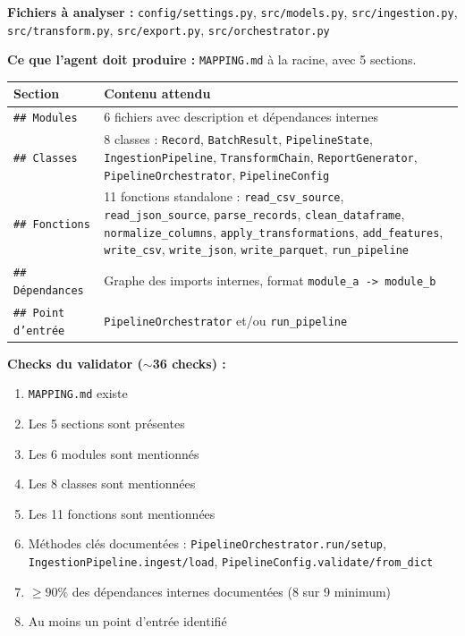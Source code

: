 \documentclass[11pt,a4paper]{article}
\newcommand{\code}[1]{\texttt{#1}}
\begin{document}
\textbf{Fichiers à analyser :}
\code{config/settings.py}, \code{src/models.py}, \code{src/ingestion.py},
\code{src/transform.py}, \code{src/export.py}, \code{src/orchestrator.py}

\textbf{Ce que l'agent doit produire :} \code{MAPPING.md} à la racine, avec 5 sections.

\begin{center}
\begin{tabular}{lp{9cm}}
  \toprule
  Section & Contenu attendu \\
  \midrule
  \code{\#\# Modules}      & 6 fichiers avec description et dépendances internes \\
  \code{\#\# Classes}      & 8 classes : \code{Record}, \code{BatchResult}, \code{PipelineState},
                             \code{IngestionPipeline}, \code{TransformChain},
                             \code{ReportGenerator}, \code{PipelineOrchestrator},
                             \code{PipelineConfig} \\
  \code{\#\# Fonctions}    & 11 fonctions standalone : \code{read\_csv\_source},
                             \code{read\_json\_source}, \code{parse\_records},
                             \code{clean\_dataframe}, \code{normalize\_columns},
                             \code{apply\_transformations}, \code{add\_features},
                             \code{write\_csv}, \code{write\_json}, \code{write\_parquet},
                             \code{run\_pipeline} \\
  \code{\#\# Dépendances}  & Graphe des imports internes, format \texttt{module\_a -> module\_b} \\
  \code{\#\# Point d'entrée} & \code{PipelineOrchestrator} et/ou \code{run\_pipeline} \\
  \bottomrule
\end{tabular}
\end{center}

\textbf{Checks du validator ($\sim$36 checks) :}
\begin{enumerate}
  \item \code{MAPPING.md} existe
  \item[2--6.] Les 5 sections sont présentes
  \item[7--12.] Les 6 modules sont mentionnés
  \item[13--20.] Les 8 classes sont mentionnées
  \item[21--31.] Les 11 fonctions sont mentionnées
  \item[32--37.] Méthodes clés documentées : \code{PipelineOrchestrator.run/setup},
        \code{IngestionPipeline.ingest/load}, \code{PipelineConfig.validate/from\_dict}
  \item[38.] $\geq 90\%$ des dépendances internes documentées (8 sur 9 minimum)
  \item[39.] Au moins un point d'entrée identifié
\end{enumerate}
\end{document}
